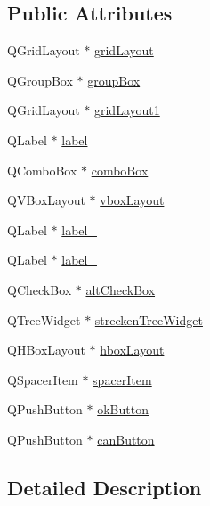 \subsection*{Public Attributes}
\begin{CompactItemize}
\item 
QGridLayout $\ast$ \hyperlink{class_ui___rechte_anpassen_class_151fb27b02b218bb55b44172251221be}{gridLayout}
\item 
QGroupBox $\ast$ \hyperlink{class_ui___rechte_anpassen_class_c7b91f5a5d57a1d5202d0c11d6366c15}{groupBox}
\item 
QGridLayout $\ast$ \hyperlink{class_ui___rechte_anpassen_class_473514c93998216fa30a45bbc276119c}{gridLayout1}
\item 
QLabel $\ast$ \hyperlink{class_ui___rechte_anpassen_class_67687728c1f104991d5217c9feeef212}{label}
\item 
QComboBox $\ast$ \hyperlink{class_ui___rechte_anpassen_class_e24375bb042c9799f340d1f0c2009323}{comboBox}
\item 
QVBoxLayout $\ast$ \hyperlink{class_ui___rechte_anpassen_class_7c2c836bdf84f3e27d76921432fedd2b}{vboxLayout}
\item 
QLabel $\ast$ \hyperlink{class_ui___rechte_anpassen_class_1bd4b03ba73aa7d648db2ab783298671}{label\_}
\item 
QLabel $\ast$ \hyperlink{class_ui___rechte_anpassen_class_acc08a056b27054b47bd83671be0ac99}{label\_}
\item 
QCheckBox $\ast$ \hyperlink{class_ui___rechte_anpassen_class_546275f181e81eed8bbdd84be95b0364}{altCheckBox}
\item 
QTreeWidget $\ast$ \hyperlink{class_ui___rechte_anpassen_class_0ac80f46dd0455d8500dadc483913950}{streckenTreeWidget}
\item 
QHBoxLayout $\ast$ \hyperlink{class_ui___rechte_anpassen_class_3d6cb54f6b5ee6c8320b96f795226af8}{hboxLayout}
\item 
QSpacerItem $\ast$ \hyperlink{class_ui___rechte_anpassen_class_bd09460344a75273bfa55e563d438f97}{spacerItem}
\item 
QPushButton $\ast$ \hyperlink{class_ui___rechte_anpassen_class_d297abb0cb0bd135a1c7da1cefcee037}{okButton}
\item 
QPushButton $\ast$ \hyperlink{class_ui___rechte_anpassen_class_de48ff73e98746448879fcabc934d9a6}{canButton}
\end{CompactItemize}


\subsection{Detailed Description}


